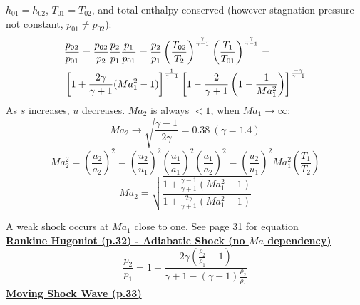 \documentclass[8pt, landscape, fleqn]{scrartcl}
\begin{document}
\begin{multicols*}{3}
$h_{01} = h_{02}$, $T_{01} = T_{02}$, and total enthalpy conserved (however stagnation pressure not constant, $p_{01}\neq p_{02}$):
\begin{align*}
    &\frac{p_{02}}{p_{01}} = \frac{p_{02}}{p_{2}} \frac{p_2}{p_1} \frac{p_1}{p_{01}} = \frac{p_2}{p_1} \left( \frac{T_{02}}{T_2} \right)^{\frac{\gamma}{\gamma-1}}\left(\frac{T_1}{T_{01}}\right)^{\frac{\gamma}{\gamma-1}} = \\
    & \left[ 1 + \frac{2 \gamma}{\gamma + 1} (Ma_1^2 -1)\right]^{\frac{\-1}{\gamma-1}} \left[1- \frac{2}{\gamma+1} \left( 1-\frac{1}{Ma_1^2}\right)\right]^{\frac{-\gamma}{\gamma-1}} 
\end{align*}
As $s$ increases, $u$ decreases. $Ma_2$ is always $<1$, when $Ma_1 \rightarrow \infty$:
\begin{equation*}
    Ma_2 \rightarrow \sqrt{\frac{\gamma-1}{2\gamma}} = 0.38 ~ (\gamma = 1.4)
\end{equation*}
\begin{equation*}
    Ma_2^2 = \left( \frac{u_2}{a_2}\right)^2 = \left( \frac{u_2}{u_1}\right)^2 \left( \frac{u_1}{a_1}\right)^2 \left( \frac{a_1}{a_2}\right)^2 = \left( \frac{u_2}{u_1}\right)^2 Ma_1^2 \left( \frac{T_1}{T_2}\right)
\end{equation*}
\begin{equation*}
    Ma_2 = \sqrt{\frac{1 + \frac{\gamma -1}{\gamma + 1} \left( Ma_1^2 -1\right)}{1 + \frac{2\gamma}{\gamma + 1}\left( Ma_1^2 - 1\right)}}
\end{equation*}

A weak shock occurs at $Ma_1$ close to one. See page 31 for equation \\

\underline{\textbf{Rankine Hugoniot (p.32) - Adiabatic Shock (no $Ma$ dependency)}}
\begin{equation*}
    \frac{p_2}{p_1} = 1 + \frac{2 \gamma \left( \frac{\rho_2}{\rho_1}-1\right)}{\gamma + 1 - (\gamma -1)\frac{\rho_2}{\rho_1}}
\end{equation*} 
\underline{\textbf{Moving Shock Wave (p.33)}}


\end{multicols*}
\end{document}
